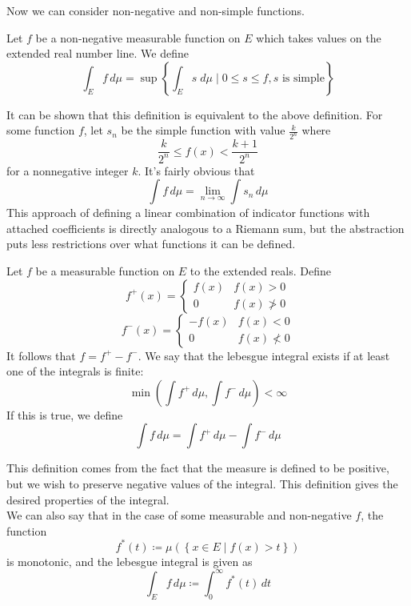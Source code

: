 \documentclass[12pt, letterpaper]{report}
\begin{document}
Now we can consider non-negative and non-simple functions.
\begin{definition}
    Let \(f\) be a non-negative measurable function on \(E\) which takes values on the extended real number line. We define
    \[
        \int_E f\,d \mu =\sup \left\{ \int_E s\;d \mu \mid 0\leq s\leq f,s\text{ is simple}  \right\}
    \]
\end{definition}
It can be shown that this definition is equivalent to the above definition. For some function \(f\), let \(s_n\) be the simple function with value \(\frac{k}{2^n}\) where
\[
    \frac{k}{2^n}\leq f(x)<\frac{k+1}{2^n}
\]
for a nonnegative integer \(k\). It's fairly obvious that 
\[
    \int f\,d \mu =\lim_{n \to \infty} \int s_n\,d \mu 
\]
This approach of defining a linear combination of indicator functions with attached coefficients is directly analogous to a Riemann sum, but the abstraction puts less restrictions over what functions it can be defined.
\begin{definition}\label{lebsign}
    Let \(f\) be a measurable function on \(E\) to the extended reals. Define 
    \[
        f^{+}(x)=\left\{
            \begin{array}{cc}
                f(x)&f(x)>0\\
                0&f(x)\ngtr 0
            \end{array}
        \right. 
    \]
    \[
        f^{-}(x)=\left\{
            \begin{array}{cc}
                -f(x)&f(x)<0\\
                0&f(x)\nless 0
            \end{array}
        \right. 
    \]
    It follows that \(f=f^+ -f^-\). We say that the lebesgue integral exists if at least one of the integrals is finite:
    \[
        \min \left( \int f^+\,d \mu ,\int f^- \,d \mu  \right) <\infty
    \]
    If this is true, we define 
    \[
        \int f\,d \mu =\int f^+ \,d \mu -\int f^- \,d \mu 
    \]
\end{definition}
This definition comes from the fact that the measure is defined to be positive, but we wish to preserve negative values of the integral. This definition gives the desired properties of the integral.\\
We can also say that in the case of some measurable and non-negative \(f\), the function 
\[
    f^* (t)\coloneqq \mu \left( \left\{ x\in E \mid f(x)>t \right\}  \right) 
\]
is monotonic, and the lebesgue integral is given as 
\[
    \int_E f\,d \mu \coloneqq \int_0^\infty f^*(t)\,dt
\]
\end{document}
